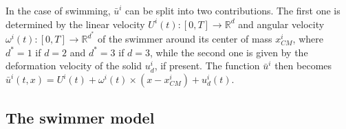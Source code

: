 \documentclass[graybox]{svmult}
\newcommand{\Fluid}{\mathcal{F}} %
\newcommand{\Real}{\mathbb{R}} %
\newcommand{\Alemap}{\mathcal{A}} %
\newcommand{\ALE}{ALE} %
\newcommand{\Vel}{u} %
\newcommand{\Pres}{p} %
\newcommand{\Density}{\rho} %
\newcommand{\tvel}{U} %
\newcommand{\angvel}{\omega} %
\newcommand{\CenterMassi}{x_{CM}^i}
\newcommand{\R}{\mathbb{R}}
\begin{document}
In the case of swimming, $\bar{\Vel}^i$ can be split into two contributions. The first one is determined by the linear velocity $\tvel^i(t): [0,T]\to\R^d$ and angular velocity  $\angvel^i(t):[0,T]\to \R^{d^*}$ of the swimmer around its center of mass $\CenterMassi$, where $d^*=1$ if $d=2$ and $d^*=3$ if $d=3$, while the second one is given by the deformation velocity of the solid $\Vel_d^i$, if present. The function $\bar{u}^i$ then becomes $\bar{\Vel}^i(t,x) = \tvel^i(t) + \angvel^i(t)\times (x-\CenterMassi)+ \Vel_d^i(t)$.




\subsection{The swimmer model}
\end{document}

